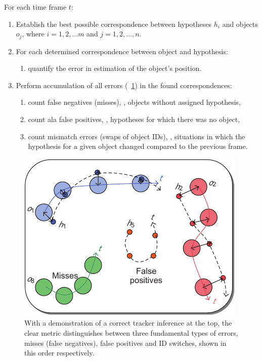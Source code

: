 For each time frame $t$:
\begin{enumerate}
    \item Establish the best possible correspondence between hypotheses $h_i$ and objects $o_j$, where $i = 1, 2, \dots m$ and $j = 1, 2, \dots, n$.
    \item For each determined correspondence between object and hypothesis:
          \begin{enumerate}
              \item quantify the error in estimation of the object's position.
          \end{enumerate}
    \item Perform accumulation of all errors (\figtext{}~\ref{fig:CLEARHypotheses}) in the found correspondences:
          \begin{enumerate}
              \item count false negatives (misses), \ietext{}, objects without assigned hypothesis,
              \item count ala false positives, \ietext{}, hypotheses for which there was no object,
              \item count mismatch errors (swaps of object IDs), \ietext{}, situations in which the hypothesis for a given object changed compared to the previous frame.
          \end{enumerate}
\end{enumerate}

\begin{figure}[t]
    \centerline{\includegraphics[width=0.55\linewidth]{figures/theoretical_foundations/clear_hypotheses_status.pdf}}
    \caption[\gls{clear} hypotheses]{With a demonstration of a correct tracker inference at the top, the \gls{clear} metric distinguishes between three fundamental types of errors, misses (false negatives), false positives and ID switches, shown in this order respectively. }
    \label{fig:CLEARHypotheses}
\end{figure}

